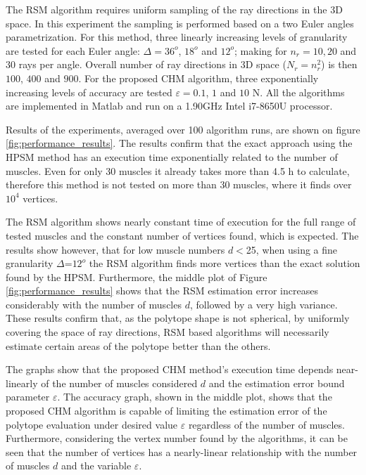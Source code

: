 The RSM algorithm \cite{carmichael2011Towards} requires uniform sampling of the ray directions in the 3D space. In this experiment the sampling is performed based on a two Euler angles parametrization. {For this method, three linearly increasing levels of granularity are tested for each Euler angle: $\Delta\!=\!36^o$, $18^o$ and $12^o$;  making for $n_r\!=\!10,20$ and $30$ rays per angle. Overall number of ray directions in 3D space ($N_r\!=\!n_r^2$) is then $100$, $400$ and $900$. For the proposed CHM algorithm, three exponentially increasing levels of accuracy are tested $\varepsilon\!=\!0.1$, $1$ and $10$ N.} All the algorithms are implemented in Matlab and run on a 1.90GHz Intel i7-8650U processor.

Results of the experiments, averaged over 100 algorithm runs, are shown on figure \ref{fig:performance_results}. The results confirm that the exact approach using the HPSM method has an execution time exponentially related to the number of muscles. Even for only 30 muscles it already takes more than 4.5 h to calculate, therefore this method is not tested on more than 30 muscles, where it finds over $10^4$ vertices.  

The RSM algorithm shows nearly constant time of execution for the full range of tested muscles and the constant number of vertices found, which is expected. The results show however, that for low muscle numbers $d\!<$25, when using a fine granularity $\Delta$=$12^o$ the RSM algorithm finds more vertices than the exact solution found by the HPSM. Furthermore, the middle plot of Figure \ref{fig:performance_results} shows that the RSM estimation error increases considerably with the number of muscles $d$, followed by a very
high variance. These results confirm that, as the polytope shape is not spherical, by uniformly covering the space of ray directions, RSM based algorithms will necessarily estimate certain areas of the polytope better than the others.

The graphs show that the proposed CHM method's execution time depends near-linearly of the number of muscles considered $d$ and the estimation error bound parameter $\varepsilon$. The accuracy graph, shown in the middle plot, shows that the proposed CHM algorithm is capable of limiting the estimation error of the polytope evaluation under desired value $\varepsilon$ regardless of the number of muscles. Furthermore, considering the vertex number found by the algorithms, it can be seen that the number of vertices has a nearly-linear relationship with the number of muscles $d$ and the variable $\varepsilon$. 

